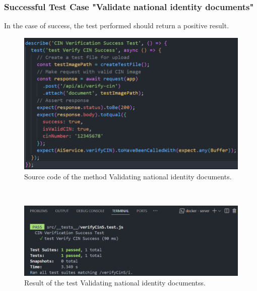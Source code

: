 \subsubsection{Successful Test Case "Validate national identity documents"} 
In the case of success, the test performed should return a positive result.
\begin{figure}[h!]
    \centering
    \includegraphics[width=1\textwidth]{figures/validate idS code.png} 
    \caption{Source code of the method Validating national identity documents.}
\end{figure} \
\begin{figure}[h]
    \centering
    \includegraphics[width=1\textwidth]{figures/result validate national idS.png}  
    \caption{Result of the test Validating national identity documentss.}
\end{figure} \
\
